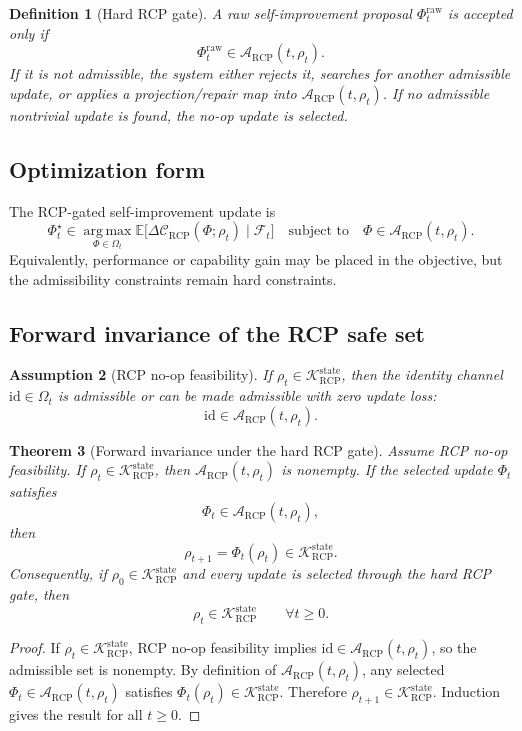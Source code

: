 \documentclass[11pt]{article}
\newtheorem{theorem}{Theorem}[section]
\newtheorem{definition}[theorem]{Definition}
\newtheorem{assumption}[theorem]{Assumption}
\newcommand{\K}{\mathcal{K}}
\newcommand{\Acal}{\mathcal{A}}
\newcommand{\Fcal}{\mathcal{F}}
\newcommand{\Ccal}{\mathcal{C}}
\newcommand{\argmax}{\operatorname*{arg\,max}}
\newcommand{\id}{\mathrm{id}}
\newcommand{\1}{\mathbf{1}}
\newcommand{\RCP}{\mathrm{RCP}}
\newcommand{\state}{\mathrm{state}}
\begin{document}
\begin{definition}[Hard RCP gate]
A raw self-improvement proposal \(\Phi_t^{\mathrm{raw}}\) is accepted only if
\[
\Phi_t^{\mathrm{raw}}\in\Acal_{\RCP}(t,\rho_t).
\]
If it is not admissible, the system either rejects it, searches for another admissible update, or applies a projection/repair map into \(\Acal_{\RCP}(t,\rho_t)\). If no admissible nontrivial update is found, the no-op update is selected.
\end{definition}

\subsection{Optimization form}

The RCP-gated self-improvement update is
\[
\Phi_t^\star
\in
\argmax_{\Phi\in\Omega_t}
\mathbb E\bigl[\Delta\Ccal_{\RCP}(\Phi;\rho_t)\mid\Fcal_t\bigr]
\quad\text{subject to}\quad
\Phi\in\Acal_{\RCP}(t,\rho_t).
\]
Equivalently, performance or capability gain may be placed in the objective, but the admissibility constraints remain hard constraints.

\subsection{Forward invariance of the RCP safe set}

\begin{assumption}[RCP no-op feasibility]
If \(\rho_t\in\K_{\RCP}^{\state}\), then the identity channel \(\id\in\Omega_t\) is admissible or can be made admissible with zero update loss:
\[
\id\in\Acal_{\RCP}(t,\rho_t).
\]
\end{assumption}

\begin{theorem}[Forward invariance under the hard RCP gate]
\label{thm:rcp_forward_invariance}
Assume RCP no-op feasibility. If \(\rho_t\in\K_{\RCP}^{\state}\), then \(\Acal_{\RCP}(t,\rho_t)\) is nonempty. If the selected update \(\Phi_t\) satisfies
\[
\Phi_t\in\Acal_{\RCP}(t,\rho_t),
\]
then
\[
\rho_{t+1}=\Phi_t(\rho_t)\in\K_{\RCP}^{\state}.
\]
Consequently, if \(\rho_0\in\K_{\RCP}^{\state}\) and every update is selected through the hard RCP gate, then
\[
\rho_t\in\K_{\RCP}^{\state}
\qquad
\forall t\ge0.
\]
\end{theorem}

\begin{proof}
If \(\rho_t\in\K_{\RCP}^{\state}\), RCP no-op feasibility implies \(\id\in\Acal_{\RCP}(t,\rho_t)\), so the admissible set is nonempty. By definition of \(\Acal_{\RCP}(t,\rho_t)\), any selected \(\Phi_t\in\Acal_{\RCP}(t,\rho_t)\) satisfies \(\Phi_t(\rho_t)\in\K_{\RCP}^{\state}\). Therefore \(\rho_{t+1}\in\K_{\RCP}^{\state}\). Induction gives the result for all \(t\ge0\).
\end{proof}
\end{document}
